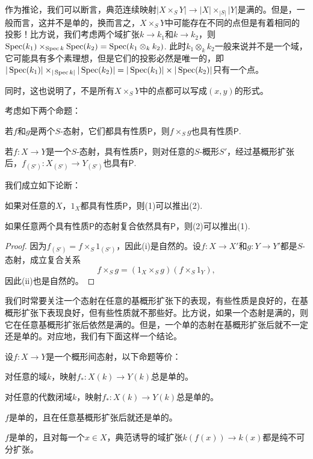 作为推论，我们可以断言，典范连续映射$|X\times_S Y|\to |X|\times_{|S|}|Y|$是满的。但是，一般而言，这并不是单的，换而言之，$X\times_S Y$中可能存在不同的点但是有着相同的投影！比方说，我们考虑两个域扩张$k\to k_1$和$k\to k_2$，则$\operatorname{Spec}(k_1)\times_{\operatorname{Spec} k} \operatorname{Spec}(k_2)=\operatorname{Spec}(k_1\otimes_k k_2)$. 此时$k_1\otimes_k k_2$一般来说并不是一个域，它可能具有多个素理想，但是它们的投影必然是唯一的，即$|\operatorname{Spec}(k_1)|\times_{|\operatorname{Spec} k|} |\operatorname{Spec}(k_2)|=|\operatorname{Spec}(k_1)|\times |\operatorname{Spec}(k_2)|$只有一个点。

同时，这也说明了，不是所有$X\times_S Y$中的点都可以写成$(x,y)$的形式。

\begin{pro}\label{pro.2.13}
考虑如下两个命题：
\begin{compactenum}[~~~(1)]
\item 若$f$和$g$是两个$S$-态射，它们都具有性质$\mathsf{P}$，则$f\times_S g$也具有性质$\mathsf{P}$.
\item 若$f:X\to Y$是一个$S$-态射，具有性质$\mathsf{P}$，则对任意的$S$-概形$S'$，经过基概形扩张后，$f_{(S')}:X_{(S')}\to Y_{(S')}$也具有$\mathsf{P}$.
\end{compactenum}
我们成立如下论断：
\begin{compactenum}[~~(i)]
\item 如果对任意的$X$，$1_X$都具有性质$\mathsf{P}$，则(1)可以推出(2).
\item 如果任意两个具有性质$\mathsf{P}$的态射复合依然具有$\mathsf{P}$，则(2)可以推出(1).
\end{compactenum}
\end{pro}

\begin{proof}
因为$f_{(S')}=f\times_S 1_{(S')}$，因此(i)是自然的。设$f:X\to X'$和$g:Y\to Y'$都是$S$-态射，成立复合关系
\[
	f\times_S g=(1_{X}\times_S g)(f\times_S 1_Y),
\]
因此(ii)也是自然的。
\end{proof}

我们时常要关注一个态射在任意的基概形扩张下的表现，有些性质是良好的，在基概形扩张下表现良好，但有些性质就不那些好。比方说，如果一个态射是满的，则它在任意基概形扩张后依然是满的。但是，一个单的态射在基概形扩张后就不一定还是单的。对应地，我们有下面这样一个结论。

\begin{pro}\label{pro.2.14}
设$f:X\to Y$是一个概形间态射，以下命题等价：
\begin{compactenum}[~~~(a)]
\item 对任意的域$k$，映射$f_*:X(k)\to Y(k)$总是单的。
\item 对任意的代数闭域$k$，映射$f_*:X(k)\to Y(k)$总是单的。
\item $f$是单的，且在任意基概形扩张后就还是单的。
\item $f$是单的，且对每一个$x\in X$，典范诱导的域扩张$k(f(x))\to k(x)$都是纯不可分扩张。
\end{compactenum}
\end{pro}

